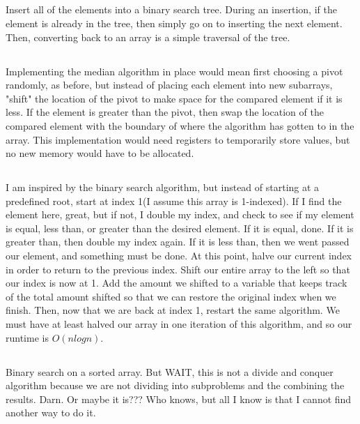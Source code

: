 \documentclass{article}
\begin{document}
\subsection{}Insert all of the elements into a binary search tree. During an insertion, if the element is already in the tree, then simply go on to inserting the next element. Then, converting back to an array is a simple traversal of the tree. 
\subsection{}Implementing the median algorithm in place would mean first choosing a pivot randomly, as before, but instead of placing each element into new subarrays, "shift" the location of the pivot to make space for the compared element if it is less. If the element is greater than the pivot, then swap the location of the compared element with the boundary of where the algorithm has gotten to in the array. This implementation would need registers to temporarily store values, but no new memory would have to be allocated. 
\subsection{}I am inspired by the binary search algorithm, but instead of starting at a predefined root, start at index 1(I assume this array is 1-indexed). If I find the element here, great, but if not, I double my index, and check to see if my element is equal, less than, or greater than the desired element. If it is equal, done. If it is greater than, then double my index again. If it is less than, then we went passed our element, and something must be done. At this point, halve our current index in order to return to the previous index. Shift our entire array to the left so that our index is now at 1. Add the amount we shifted to a variable that keeps track of the total amount shifted so that we can restore the original index when we finish. Then, now that we are back at index 1, restart the same algorithm. We must have at least halved our array in one iteration of this algorithm, and so our runtime is $O(nlogn)$.
\subsection{}Binary search on a sorted array. But WAIT, this is not a divide and conquer algorithm because we are not dividing into subproblems and the combining the results. Darn. Or maybe it is??? Who knows, but all I know is that I cannot find another way to do it. 
\end{document}
